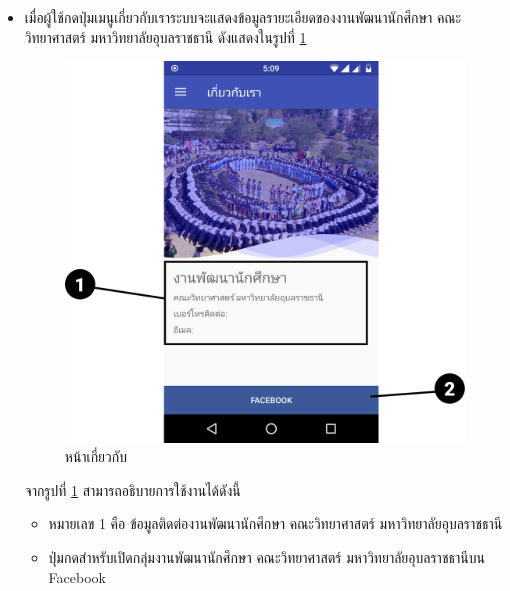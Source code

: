 \begin{enumerate}
\begin{itemize}
			\item เมื่อผู้ใช้กดปุ่มเมนูเกี่ยวกับเราระบบจะแสดงข้อมูลรายะเอียดของงานพัฒนานักศึกษา คณะวิทยาศาสตร์ มหาวิทยาลัยอุบลราชธานี ดังแสดงในรูปที่ \ref{Fig:about}
			\begin{figure}[H]
				\centering
				\includegraphics[width=0.5\columnwidth]{Figures/7/Manual/about}
				\caption{หน้าเกี่ยวกับ}
				\label{Fig:about}
			\end{figure}
			จากรูปที่ \ref{Fig:about} สามารถอธิบายการใช้งานได้ดังนี้
			\begin{itemize}[label={--}]
				\item หมายเลข 1 คือ ข้อมูลติดต่องานพัฒนานักศึกษา คณะวิทยาศาสตร์ มหาวิทยาลัยอุบลราชธานี
				\item ปุ่มกดสำหรับเปิดกลุ่มงานพัฒนานักศึกษา คณะวิทยาศาสตร์ มหาวิทยาลัยอุบลราชธานีบน Facebook
			\end{itemize}  
				
		\end{itemize}

\end{enumerate}
